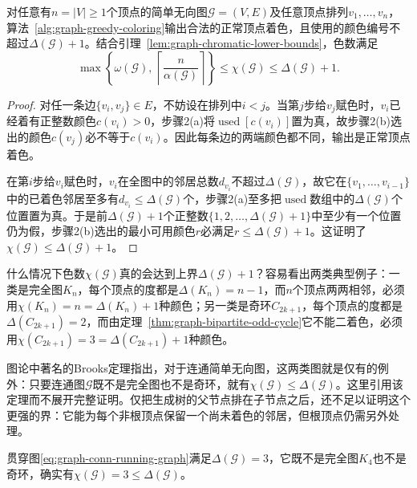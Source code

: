 \begin{theorem}[贪心着色的正确性与最大度上界]
\label{thm:graph-chromatic-bounds}
对任意有$n=|V|\geq 1$个顶点的简单无向图$\mathcal G=(V,E)$及任意顶点排列$v_1,\ldots,v_n$，算法~\ref{alg:graph-greedy-coloring}输出合法的正常顶点着色，且使用的颜色编号不超过$\Delta(\mathcal G)+1$。结合引理~\ref{lem:graph-chromatic-lower-bounds}，色数满足
\begin{equation}
\max\left\{\omega(\mathcal G),\,\left\lceil\frac{n}{\alpha(\mathcal G)}\right\rceil\right\}\leq \chi(\mathcal G)\leq \Delta(\mathcal G)+1.
\label{eq:graph-chromatic-bounds}
\end{equation}
\end{theorem}

\begin{proof}
对任一条边$\{v_i,v_j\}\in E$，不妨设在排列中$i<j$。当第$j$步给$v_j$赋色时，$v_i$已经着有正整数颜色$c(v_i)>0$，步骤2(a)将$\operatorname{used}[c(v_i)]$置为真，故步骤2(b)选出的颜色$c(v_j)$必不等于$c(v_i)$。因此每条边的两端颜色都不同，输出是正常顶点着色。

在第$i$步给$v_i$赋色时，$v_i$在全图中的邻居总数$d_{v_i}$不超过$\Delta(\mathcal G)$，故它在$\{v_1,\ldots,v_{i-1}\}$中的已着色邻居至多有$d_{v_i}\leq\Delta(\mathcal G)$个，步骤2(a)至多把$\operatorname{used}$数组中的$\Delta(\mathcal G)$个位置置为真。于是前$\Delta(\mathcal G)+1$个正整数$\{1,2,\ldots,\Delta(\mathcal G)+1\}$中至少有一个位置仍为假，步骤2(b)选出的最小可用颜色$r$必满足$r\leq\Delta(\mathcal G)+1$。这证明了$\chi(\mathcal G)\leq\Delta(\mathcal G)+1$。
\end{proof}

什么情况下色数$\chi(\mathcal G)$真的会达到上界$\Delta(\mathcal G)+1$？容易看出两类典型例子：一类是完全图$K_n$，每个顶点的度都是$\Delta(K_n)=n-1$，而$n$个顶点两两相邻，必须用$\chi(K_n)=n=\Delta(K_n)+1$种颜色；另一类是奇环$C_{2k+1}$，每个顶点的度都是$\Delta(C_{2k+1})=2$，而由定理~\ref{thm:graph-bipartite-odd-cycle}它不能二着色，必须用$\chi(C_{2k+1})=3=\Delta(C_{2k+1})+1$种颜色。

图论中著名的Brooks定理指出，对于连通简单无向图，这两类图就是仅有的例外：只要连通图$\mathcal G$既不是完全图也不是奇环，就有$\chi(\mathcal G)\leq\Delta(\mathcal G)$。这里引用该定理而不展开完整证明。仅把生成树的父节点排在子节点之后，还不足以证明这个更强的界：它能为每个非根顶点保留一个尚未着色的邻居，但根顶点仍需另外处理。

贯穿图\eqref{eq:graph-conn-running-graph}满足$\Delta(\mathcal G)=3$，它既不是完全图$K_4$也不是奇环，确实有$\chi(\mathcal G)=3\leq\Delta(\mathcal G)$。

